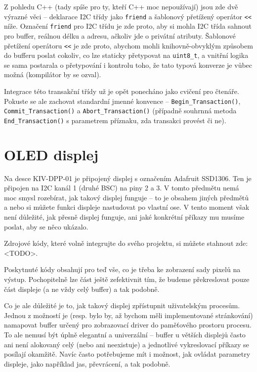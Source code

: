 \documentclass{article}
\begin{document}
Z pohledu C++ (tady spíše pro ty, kteří C++ moc nepoužívají) jsou zde dvě výrazné věci -- deklarace I2C třídy jako \texttt{friend} a šablonový přetížený operátor \texttt{<<} níže. Označení \texttt{friend} pro I2C třídu je zde proto, aby si mohla I2C třída sahnout pro buffer, reálnou délku a adresu, ačkoliv jde o privátní atributy. Šablonové přetížení operátoru \texttt{<<} je zde proto, abychom mohli knihovně-obvyklým způsobem do bufferu poslat cokoliv, co lze staticky přetypovat na \texttt{uint8\_t}, a vnitřní logika se sama postarala o přetypování i kontrolu toho, že tato typová konverze je vůbec možná (kompilátor by se ozval).

Integrace této transakční třídy už je opět ponecháno jako cvičení pro čtenáře. Pokuste se ale zachovat standardní jmenné konvence -- \texttt{Begin\_Transaction()}, \texttt{Commit\_Transaction()} a \texttt{Abort\_Transaction()} (případně souhrnná metoda \texttt{End\_Transaction()} s parametrem příznaku, zda transakci provést či ne).

\section{OLED displej}

Na desce KIV-DPP-01 je připojený displej s označením Adafruit SSD1306. Ten je připojen na I2C kanál 1 (druhé BSC) na piny 2 a 3. V tomto předmětu nemá moc smysl rozebírat, jak takový displej funguje -- to je obsahem jiných předmětů a nebo si můžete funkci displeje nastudovat po vlastní ose. V tento moment však není důležité, jak přesně displej funguje, ani jaké konkrétní příkazy mu musíme poslat, aby se něco ukázalo.

Zdrojové kódy, které volně integrujte do svého projektu, si můžete stahnout zde: <TODO>.

Poskytnuté kódy obsahují pro teď vše, co je třeba ke zobrazení sady pixelů na výstup. Pochopitelně lze část ještě zefektivnit tím, že budeme překreslovat pouze část displeje (a ne vždy celý buffer) a tak podobně.

Co je ale důležité je to, jak takový displej zpřístupnit uživatelským procesům. Jednou z možností je (resp. bylo by, až bychom měli implementované stránkování) namapovat buffer určený pro zobrazovací driver do paměťového prostoru procesu. To ale nemusí být úplně elegantní a univerzální -- buffer u větších displejů často ani není alokovaný celý (nebo ani neexistuje) a jednotlivé vykreslovací příkazy se posílají okamžitě. Navíc často potřebujeme mít i možnost, jak ovládat parametry displeje, jako například jas, převrácení, a tak podobně.
\end{document}
